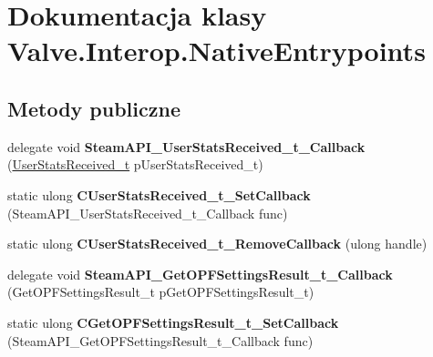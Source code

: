 \hypertarget{class_valve_1_1_interop_1_1_native_entrypoints}{}\section{Dokumentacja klasy Valve.\+Interop.\+Native\+Entrypoints}
\label{class_valve_1_1_interop_1_1_native_entrypoints}
\subsection*{Metody publiczne}
\begin{DoxyCompactItemize}
\item 
\mbox{\label{class_valve_1_1_interop_1_1_native_entrypoints_a38cb9efb36cfac8a650107c541d76b71}} 
delegate void {\bfseries Steam\+A\+P\+I\+\_\+\+User\+Stats\+Received\+\_\+t\+\_\+\+Callback} (\hyperlink{struct_valve_1_1_steamworks_1_1_user_stats_received__t}{User\+Stats\+Received\+\_\+t} p\+User\+Stats\+Received\+\_\+t)
\item 
\mbox{\label{class_valve_1_1_interop_1_1_native_entrypoints_a75a9072241321e7dd8164ee262e0fcb6}} 
static ulong {\bfseries C\+User\+Stats\+Received\+\_\+t\+\_\+\+Set\+Callback} (Steam\+A\+P\+I\+\_\+\+User\+Stats\+Received\+\_\+t\+\_\+\+Callback func)
\item 
\mbox{\label{class_valve_1_1_interop_1_1_native_entrypoints_aaf38c085f08cf286e3b862b2797ee71e}} 
static ulong {\bfseries C\+User\+Stats\+Received\+\_\+t\+\_\+\+Remove\+Callback} (ulong handle)
\item 
\mbox{\label{class_valve_1_1_interop_1_1_native_entrypoints_a253e5c43f304d6cf4419925928b4c40a}} 
delegate void {\bfseries Steam\+A\+P\+I\+\_\+\+Get\+O\+P\+F\+Settings\+Result\+\_\+t\+\_\+\+Callback} (Get\+O\+P\+F\+Settings\+Result\+\_\+t p\+Get\+O\+P\+F\+Settings\+Result\+\_\+t)
\item 
\mbox{\label{class_valve_1_1_interop_1_1_native_entrypoints_ae042e11f5d88375055ae5670c21feb87}} 
static ulong {\bfseries C\+Get\+O\+P\+F\+Settings\+Result\+\_\+t\+\_\+\+Set\+Callback} (Steam\+A\+P\+I\+\_\+\+Get\+O\+P\+F\+Settings\+Result\+\_\+t\+\_\+\+Callback func)

\end{DoxyCompactItemize}
